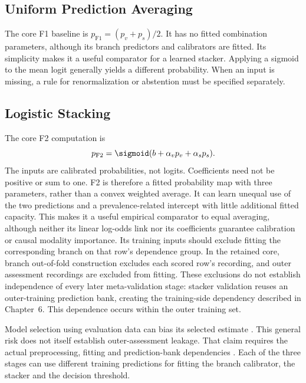 \subsection{Uniform Prediction Averaging}
The core F1 baseline is $p_{\mathrm{F1}}=(p_v+p_s)/2$. It has no fitted combination parameters, although its branch predictors and calibrators are fitted. Its simplicity makes it a useful comparator for a learned stacker. Applying a sigmoid to the mean logit generally yields a different probability. When an input is missing, a rule for renormalization or abstention must be specified separately.

\subsection{Logistic Stacking}
The core F2 computation is
\begin{equation}
 p_{\mathrm{F2}}=\sigmoid(b+\alpha_v p_v+\alpha_s p_s).
 \label{eq:f2}
\end{equation}
The inputs are calibrated probabilities, not logits. Coefficients need not be positive or sum to one. F2 is therefore a fitted probability map with three parameters, rather than a convex weighted average. It can learn unequal use of the two predictions and a prevalence-related intercept with little additional fitted capacity. This makes it a useful empirical comparator to equal averaging, although neither its linear log-odds link nor its coefficients guarantee calibration or causal modality importance. Its training inputs should exclude fitting the corresponding branch on that row's dependence group. In the retained core, branch out-of-fold construction excludes each scored row's recording, and outer assessment recordings are excluded from fitting. These exclusions do not establish independence of every later meta-validation stage: stacker validation reuses an outer-training prediction bank, creating the training-side dependency described in Chapter~6. This dependence occurs within the outer training set.

Model selection using evaluation data can bias its selected estimate \citep{P004}. This general risk does not itself establish outer-assessment leakage. That claim requires the actual preprocessing, fitting and prediction-bank dependencies \citep{P017}. Each of the three stages can use different training predictions for fitting the branch calibrator, the stacker and the decision threshold.

